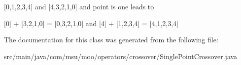 \mbox{[}0,1,2,3,4\mbox{]} and \mbox{[}4,3,2,1,0\mbox{]} and point is one leads to

\mbox{[}0\mbox{]} + \mbox{[}3,2,1,0\mbox{]} = \mbox{[}0,3,2,1,0\mbox{]} and \mbox{[}4\mbox{]} + \mbox{[}1,2,3,4\mbox{]} = \mbox{[}4,1,2,3,4\mbox{]} 

The documentation for this class was generated from the following file\-:\begin{DoxyCompactItemize}
\item 
src/main/java/com/msu/moo/operators/crossover/Single\-Point\-Crossover.\-java\end{DoxyCompactItemize}
